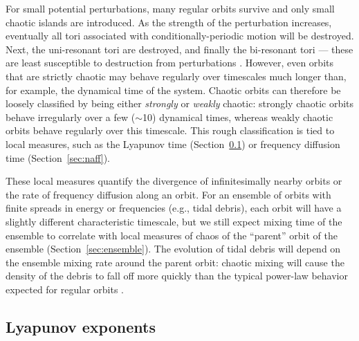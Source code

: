 \documentclass[letterpaper,12pt,preprint]{aastex}
\begin{document}
For small potential perturbations, many regular orbits survive and only small chaotic islands are introduced. As the strength of the perturbation increases, eventually all tori associated with conditionally-periodic motion will be destroyed. Next, the uni-resonant tori are destroyed, and finally the bi-resonant tori --- these are least susceptible to destruction from perturbations \citep[e.g., see][]{valluri98}. However, even orbits that are strictly chaotic may behave regularly over timescales much longer than, for example, the dynamical time of the system. Chaotic orbits can therefore be loosely classified by being either \emph{strongly} or \emph{weakly} chaotic: strongly chaotic orbits behave irregularly over a few ($\sim$10) dynamical times, whereas weakly chaotic orbits behave regularly over this timescale. This rough classification is tied to local measures, such as the Lyapunov time (Section~\ref{sec:lyap}) or frequency diffusion time (Section~\ref{sec:naff}). 

These local measures quantify the divergence of infinitesimally nearby orbits or the rate of frequency diffusion along an orbit. For an ensemble of orbits with finite spreads in energy or frequencies (e.g., tidal debris), each orbit will have a slightly different characteristic timescale, but we still expect mixing time of the ensemble to correlate with local measures of chaos of the ``parent'' orbit of the ensemble (Section~\ref{sec:ensemble}). The evolution of tidal debris will depend on the ensemble mixing rate around the parent orbit: chaotic mixing will cause the density of the debris to fall off more quickly than the typical power-law behavior expected for regular orbits \citep[e.g.,][]{merritt96, helmi99}. 

\subsection{Lyapunov exponents} \label{sec:lyap}
\end{document}
